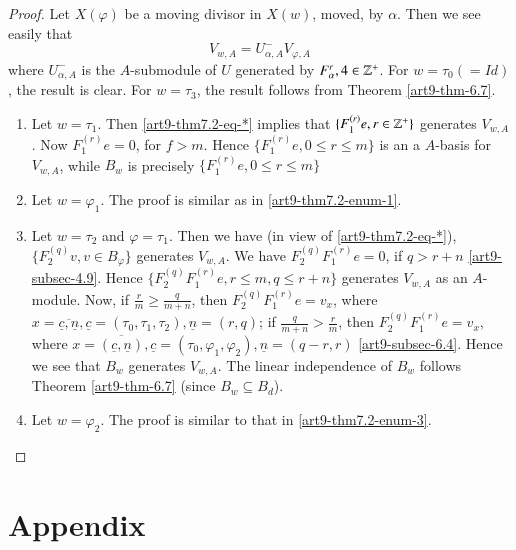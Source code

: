\begin{proof}
Let $X(\varphi)$ be a moving divisor in $X(w)$, moved, by $\alpha$. Then we see easily that
\begin{equation*}\label{art9-thm7.2-eq-*}
V_{w, A} = U_{\alpha, A}^{-}V_{\varphi, A}\tag{$\ast$}
\end{equation*}
where $U_{\alpha, A}^{-}$ is the $A$-submodule of $U$ generated by $ F_{\alpha}^{r}, 4 \in \mathbb{Z}^{+}$. For $w = \tau_{0}(=Id)$, the result is clear. For $w = \tau_{3}$, the result follows from
Theorem \ref{art9-thm-6.7}.
\begin{enumerate}[(1)]
\item Let $w= \tau_{1}$. Then \eqref{art9-thm7.2-eq-*} implies that $ \{ F_{1}^{(r)}e,r \in \mathbb{Z}^{+}\}$ generates $V_{w,A}$. Now $F_{1}^{(r)}e = 0$, for $f > m$. Hence $\{F_{1}^{(r)}e, 0 \leq r \leq m \}$ is an a $A$-basis for $V_{w, A}$, while $B_{w}$ is precisely $\{ F_{1}^{(r)} e, 0 \leq r \leq m \}$\label{art9-thm7.2-enum-1}

\item Let $w= \varphi_{1}$. The proof is similar as in \eqref{art9-thm7.2-enum-1}.\label{art9-thm7.2-enum-2}

\item Let $w =\tau_{2}$ and $\varphi= \tau_{1}$. Then  we have (in view of \eqref{art9-thm7.2-eq-*}), $\{F_{2}^{(q)}v,v \in B_{\varphi}\}$ generates $V_{w, A}$. We  have $F_{2}^{(q)}F_{1}^{(r)}e = 0$, if $q> r + n$ \eqref{art9-subsec-4.9}. Hence $\{F_{2}^{(q)}F_{1}^{(r)} e, r \leq m, q \leq r + n\}$ generates $V_{w, A}$ as an $A$-module. Now, if $\frac{r}{m} \geq \frac{q}{m+n}$, then $F_{2}^{(q)}F_{1}^{(r)} e = v_{x}$, where $x = \overline{\underline{c}, \underline{n}}, \underline{c} = (\tau_{0},\tau_{1}, \tau_{2}), \underline{n} = (r, q)$; if $\frac{q}{m+n} > \frac{r}{m}$, then $F_{2}^{(q)}F_{1}^{(r)}e=v_{x}$, where $x = \overline{(\underline{c}, \underline{n})}, \underline{c} = (\tau_{0}, \varphi_{1}, \varphi_{2}), \underline{n} = (q-r,r)$ \eqref{art9-subsec-6.4}. Hence we see that $B_{w}$ generates $V_{w,A}$. The linear independence of $B_{w}$ follows Theorem \ref{art9-thm-6.7} (since $B_{w}\subseteq B_{d}$).\label{art9-thm7.2-enum-3}

\item Let $w=\varphi_{2}$. The proof is similar to that in \eqref{art9-thm7.2-enum-3}.
\end{enumerate}
\end{proof}

\section{Appendix}\label{art9-sec-8}

